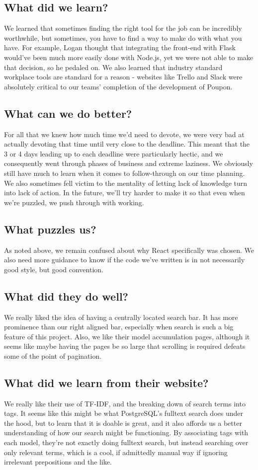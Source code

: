 \documentclass{scrartcl}
\begin{document}
    \subsection*{What did we learn?}
    We learned that sometimes finding the right tool for the job can be incredibly worthwhile, but sometimes, you have to find a way to make do with what you have. For example, Logan thought that integrating the front-end with Flask would've been much more easily done with Node.js, yet we were not able to make that decision, so he pedaled on. We also learned that industry standard workplace tools are standard for a reason - websites like Trello and Slack were absolutely critical to our teams' completion of the development of Poupon.
    \subsection*{What can we do better?}
    For all that we knew how much time we'd need to devote, we were very bad at actually devoting that time until very close to the deadline. This meant that the 3 or 4 days leading up to each deadline were particularly hectic, and we consequently went through phases of business and extreme laziness. We obviously still have much to learn when it comes to follow-through on our time planning. We also sometimes fell victim to the mentality of letting lack of knowledge turn into lack of action. In the future, we'll try harder to make it so that even when we're puzzled, we push through with working.
    \subsection*{What puzzles us?}
    As noted above, we remain confused about why React specifically was chosen. We also need more guidance to know if the code we've written is in not necessarily good style, but good convention.
    \subsection*{What did they do well?}
    We really liked the idea of having a centrally located search bar. It has more prominence than our right aligned bar, especially when search is such a big feature of this project. Also, we like their model accumulation pages, although it seems like maybe having the pages be so large that scrolling is required defeats some of the point of pagination.
    \subsection*{What did we learn from their website?}
    We really like their use of TF-IDF, and the breaking down of search terms into tags. It seems like this might be what PostgreSQL's fulltext search does under the hood, but to learn that it is doable is great, and it also affords us a better understanding of how our search might be functioning. By associating tags with each model, they're not exactly doing fulltext search, but instead searching over only relevant terms, which is a cool, if admittedly manual way if ignoring irrelevant prepositions and the like.
\end{document}
